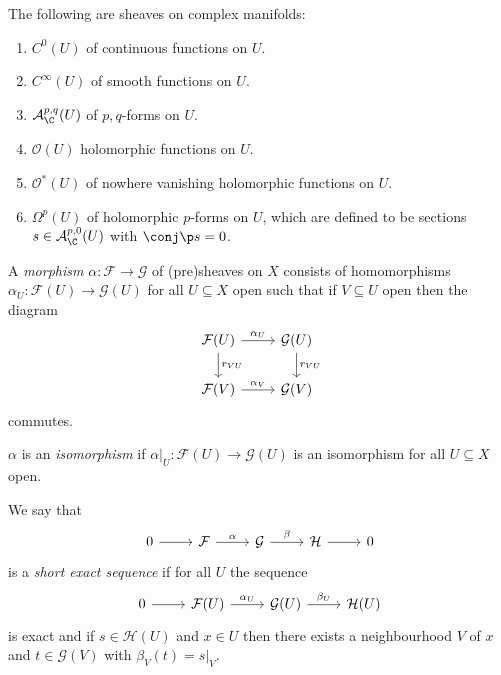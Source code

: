 \documentclass[a4paper]{article}
\begin{document}
\begin{eg}
  The following are sheaves on complex manifolds:
  \begin{enumerate}
  \item \(C^0(U)\) of continuous functions on \(U\).
  \item \(C^\infty(U)\) of smooth functions on \(U\).
  \item \(\mathcal A_\C^{p, q}(U)\) of \(p, q\)-forms on \(U\).
  \item \(\mathcal O(U)\) holomorphic functions on \(U\).
  \item \(\mathcal O^*(U)\) of nowhere vanishing holomorphic functions on \(U\).
  \item \(\Omega^p(U)\) of holomorphic \(p\)-forms on \(U\), which are defined to be sections \(s \in \mathcal A_\C^{p, 0}(U)\) with \(\conj \p s = 0\).
  \end{enumerate}
\end{eg}

\begin{definition}
  A \emph{morphism} \(\alpha: \mathcal F \to \mathcal G\) of (pre)sheaves on \(X\) consists of homomorphisms \(\alpha_U: \mathcal F(U) \to \mathcal G(U)\) for all \(U \subseteq X\) open such that if \(V \subseteq U\) open then the diagram
  \[
    \begin{tikzcd}
      \mathcal F(U) \ar[r, "\alpha_U"] \ar[d, "r_{VU}"] & \mathcal G(U) \ar[d, "r_{VU}"] \\
      \mathcal F(V) \ar[r, "\alpha_V"] & \mathcal G(V)
    \end{tikzcd}
  \]
  commutes.

  \(\alpha\) is an \emph{isomorphism} if \(\alpha|_U: \mathcal F(U) \to \mathcal G(U)\) is an isomorphism for all \(U \subseteq X\) open.
\end{definition}

\begin{definition}
  We say that
  \[
    \begin{tikzcd}
      0 \ar[r] & \mathcal F \ar[r, "\alpha"] & \mathcal G \ar[r, "\beta"] & \mathcal H \ar[r] & 0
    \end{tikzcd}
  \]
  is a \emph{short exact sequence} if for all \(U\) the sequence
  \[
    \begin{tikzcd}
      0 \ar[r] & \mathcal F(U) \ar[r, "\alpha_U"] & \mathcal G(U) \ar[r, "\beta_U"] & \mathcal H(U)
    \end{tikzcd}
  \]
  is exact and if \(s \in \mathcal H(U)\) and \(x \in U\) then there exists a neighbourhood \(V\) of \(x\) and \(t \in \mathcal G(V)\) with \(\beta_V(t) = s|_V\).
\end{definition}
\end{document}
